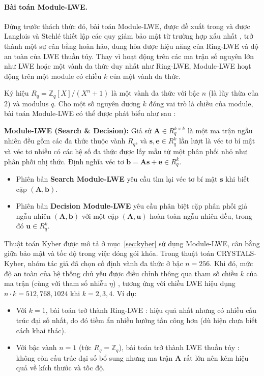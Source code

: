 \documentclass[../LuanVan.tex]{subfiles}
\begin{document}
\paragraph{Bài toán Module-LWE.} Đứng trước thách thức đó, bài toán Module-LWE, được đề xuất trong \cite{BGV12} và được Langlois và Stehlé thiết lập các quy giảm bảo mật từ trường hợp xấu nhất \cite{LangloisStehle15}, trở thành một sự cân bằng hoàn hảo, dung hòa được hiệu năng của Ring-LWE và độ an toàn của LWE thuần túy.
Thay vì hoạt động trên các ma trận số nguyên lớn như LWE hoặc một vành đa thức duy nhất như Ring-LWE, Module-LWE hoạt động trên một module có chiều $k$ của một vành đa thức.

Ký hiệu $R_q = \mathbb{Z}_q[X]/(X^n + 1)$ là một vành đa thức với bậc $n$ (là lũy thừa của $2$) và modulus $q$. Cho một số nguyên dương $k$ đóng vai trò là chiều của module, bài toán Module-LWE có thể được phát biểu như sau \cite[Mục 2.3]{Bos18}:

\begin{bt}
    \textbf{Module-LWE (Search \& Decision):}
    Giả sử $\mathbf{A} \in R_q^{k \times k}$ là một ma trận ngẫu nhiên đều gồm các đa thức thuộc vành $R_q$, và $\mathbf{s}, \mathbf{e} \in R_q^k$ lần lượt là véc tơ bí mật và véc tơ nhiễu có các hệ số đa thức được lấy mẫu từ một phân phối nhỏ như phân phối nhị thức. Định nghĩa véc tơ $\mathbf{b} = \mathbf{A}\mathbf{s} + \mathbf{e} \in R_q^k$.
    \begin{itemize}
        \item Phiên bản \textbf{Search Module-LWE} yêu cầu tìm lại véc tơ bí mật $\mathbf{s}$ khi biết cặp $(\mathbf{A}, \mathbf{b})$.
        \item Phiên bản \textbf{Decision Module-LWE} yêu cầu phân biệt cặp phân phối giả ngẫu nhiên $(\mathbf{A}, \mathbf{b})$ với một cặp $(\mathbf{A}, \mathbf{u})$ hoàn toàn ngẫu nhiên đều, trong đó $\mathbf{u} \in R_q^k$.
    \end{itemize}
    \label{bt:moduleLWE}
\end{bt}

Thuật toán Kyber được mô tả ở mục~\ref{sec:kyber} sử dụng Module-LWE, cân bằng giữa bảo mật và tốc độ trong việc đóng gói khóa. Trong thuật toán CRYSTALS-Kyber, nhóm tác giả đã chọn cố định vành đa thức ở bậc $n=256$. Khi đó, mức độ an toàn của hệ thống chủ yếu được điều chỉnh thông qua tham số chiều $k$ của ma trận (cùng với tham số nhiễu $\eta$) \cite{Bos18}, tương ứng với chiều LWE hiệu dụng $n\cdot k = 512, 768, 1024$ khi $k = 2, 3, 4$.
Ví dụ:
\begin{itemize}
    \item Với $k=1$, bài toán trở thành Ring-LWE \cite{Bos18}: hiệu quả nhất nhưng có nhiều cấu trúc đại số nhất, do đó tiềm ẩn nhiều hướng tấn công hơn (dù hiện chưa biết cách khai thác).
    \item Với bậc vành $n=1$ (tức $R_q = \mathbb{Z}_q$), bài toán trở thành LWE thuần túy \cite{Bos18}: không còn cấu trúc đại số bổ sung nhưng ma trận $\mathbf{A}$ rất lớn nên kém hiệu quả về kích thước và tốc độ.
\end{itemize}
\end{document}
